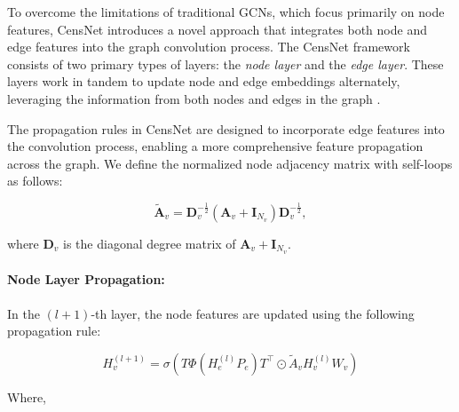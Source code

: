 To overcome the limitations of traditional GCNs, which focus primarily on node features, CensNet introduces a novel approach that integrates both node and edge features into the graph convolution process. The CensNet framework consists of two primary types of layers: the \textit{node layer} and the \textit{edge layer}. These layers work in tandem to update node and edge embeddings alternately, leveraging the information from both nodes and edges in the graph \cite{9224195}.

The propagation rules in CensNet are designed to incorporate edge features into the convolution process, enabling a more comprehensive feature propagation across the graph. We define the normalized node adjacency matrix with self-loops as follows:

\begin{equation}
\tilde{\mathbf{A}}_v = \mathbf{D}_v^{-\frac{1}{2}} (\mathbf{A}_v + \mathbf{I}_{N_v}) \mathbf{D}_v^{-\frac{1}{2}},
\end{equation}

where $\mathbf{D}_v$ is the diagonal degree matrix of $\mathbf{A}_v + \mathbf{I}_{N_v}$.

\paragraph{Node Layer Propagation:}


In the $(l+1)$-th layer, the node features are updated using the following propagation rule:

\[
H^{(l+1)}_v = \sigma\left(T\Phi\left(H^{(l)}_e P_e\right)T^\top \odot \tilde{A}_v H^{(l)}_v W_v\right)
\]

Where, 

